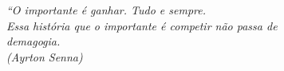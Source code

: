 \begin{epigrafe}
    \vspace*{\fill}
	\begin{flushright}
		\textit{``O importante é ganhar. Tudo e sempre. \\
                Essa história que o importante é competir não passa de \\
                demagogia.\\
                (Ayrton Senna)}
	\end{flushright}
\end{epigrafe}
